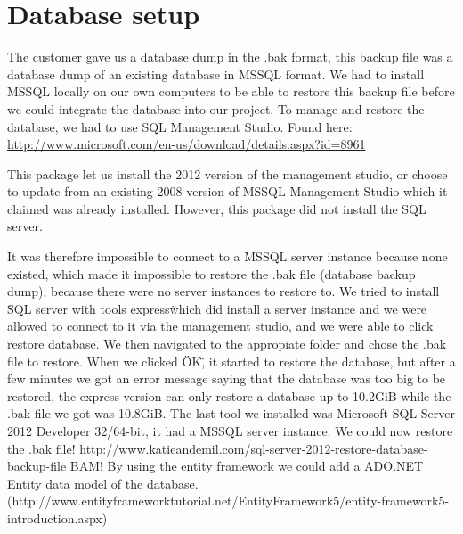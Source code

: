 \section{Database setup}
The customer gave us a database dump in the .bak format, this backup file was a database dump of an existing database in MSSQL format. We had to install MSSQL locally on our own computers to be able to restore this backup file before we could integrate the database into our project. To manage and restore the database, we had to use SQL Management Studio. Found here: \href{http://www.microsoft.com/en-us/download/details.aspx?id=8961}{http://www.microsoft.com/en-us/download/details.aspx?id=8961}

This package let us install the 2012 version of the management studio, or choose to update from an existing 2008 version of MSSQL Management Studio which it claimed was already installed. However, this package did not install the SQL server.

It was therefore impossible to connect to a MSSQL server instance because none existed, which made it impossible to restore the .bak file (database backup dump), because there were no server instances to restore to.
We tried to install \"SQL server with tools express\" which did install a server instance and we were allowed to connect to it via the management studio, and we were able to click \"restore database\". We then navigated to the appropiate folder and chose the .bak file to restore. When we clicked \"OK\", it started to restore the database, but after a few minutes we got an error message saying that the database was too big to be restored, the express version can only restore a database up to 10.2GiB while the .bak file we got was 10.8GiB.
The last tool we installed was Microsoft SQL Server 2012 Developer 32/64-bit, it had a MSSQL server instance.
We could now restore the .bak file! http://www.katieandemil.com/sql-server-2012-restore-database-backup-file BAM!
By using the entity framework we could add a ADO.NET Entity data model of the database. (http://www.entityframeworktutorial.net/EntityFramework5/entity-framework5-introduction.aspx)